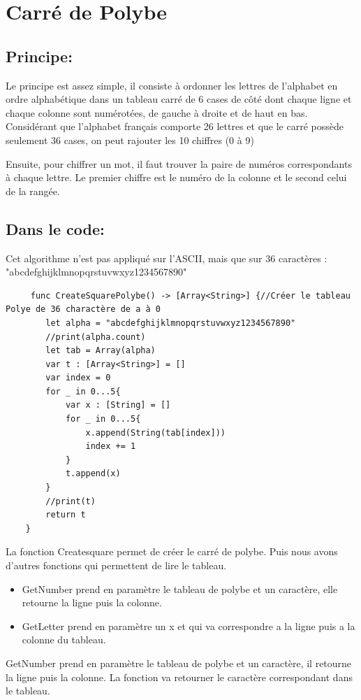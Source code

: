 \documentclass{article}
\begin{document}
\section{Carré de Polybe}
\subsection{Principe: }
Le principe est assez simple, il consiste à ordonner les lettres de l’alphabet en ordre alphabétique dans un tableau carré de 6 cases de côté dont chaque ligne et chaque colonne sont numérotées, de gauche à droite et de haut en bas. Considérant que l’alphabet français comporte 26 lettres et que le carré possède seulement 36 cases, on peut rajouter les 10 chiffres (0 à 9)

Ensuite, pour chiffrer un mot, il faut trouver la paire de numéros correspondants à chaque lettre. Le premier chiffre est le numéro de la colonne et le second celui de la rangée.

\subsection{Dans le code:}
Cet algorithme n'est pas appliqué sur l'ASCII, mais que sur 36 caractères : "abcdefghijklmnopqrstuvwxyz1234567890"\newline
\begin{verbatim}
     func CreateSquarePolybe() -> [Array<String>] {//Créer le tableau Polye de 36 charactère de a à 0
        let alpha = "abcdefghijklmnopqrstuvwxyz1234567890"
        //print(alpha.count)
        let tab = Array(alpha)
        var t : [Array<String>] = []
        var index = 0
        for _ in 0...5{
            var x : [String] = []
            for _ in 0...5{
                x.append(String(tab[index]))
                index += 1
            }
            t.append(x)
        }
        //print(t)
        return t
    }
\end{verbatim}
La fonction Createsquare permet de créer le carré de polybe.
Puis nous avons d'autres fonctions qui permettent de lire le tableau.
\begin{itemize}
    \item GetNumber prend en paramètre le tableau de polybe et un caractère, elle retourne la ligne puis la colonne.
    \item GetLetter prend en paramètre un x et qui va correspondre a la ligne puis a la colonne du tableau.
    
\end{itemize}
GetNumber prend en paramètre le tableau de polybe et un caractère, il retourne la ligne puis la colonne. La fonction va retourner le caractère correspondant dans le tableau.
\end{document}
